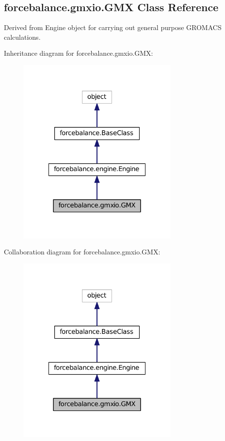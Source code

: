 \hypertarget{classforcebalance_1_1gmxio_1_1GMX}{\subsection{forcebalance.\-gmxio.\-G\-M\-X Class Reference}
\label{classforcebalance_1_1gmxio_1_1GMX}
}


Derived from Engine object for carrying out general purpose G\-R\-O\-M\-A\-C\-S calculations.  




Inheritance diagram for forcebalance.\-gmxio.\-G\-M\-X\-:
\nopagebreak
\begin{figure}[H]
\begin{center}
\leavevmode
\includegraphics[width=228pt]{classforcebalance_1_1gmxio_1_1GMX__inherit__graph}
\end{center}
\end{figure}


Collaboration diagram for forcebalance.\-gmxio.\-G\-M\-X\-:
\nopagebreak
\begin{figure}[H]
\begin{center}
\leavevmode
\includegraphics[width=228pt]{classforcebalance_1_1gmxio_1_1GMX__coll__graph}
\end{center}
\end{figure}
